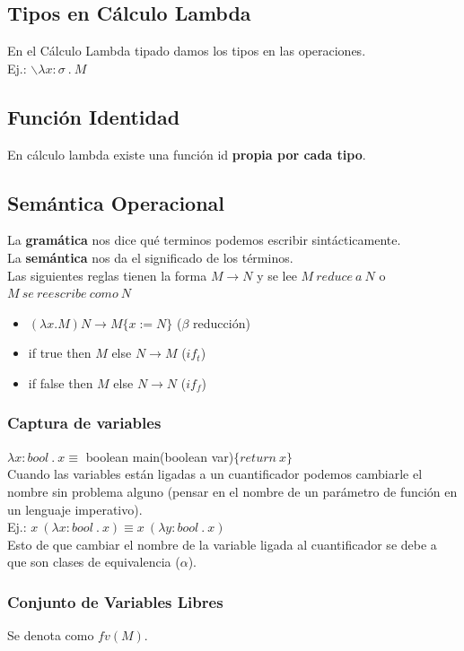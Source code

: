 \documentclass[10pt,a4paper]{article}
\begin{document}
\subsection{Tipos en Cálculo Lambda}
En el Cálculo Lambda tipado damos los tipos en las operaciones. \\
Ej.: $\backslash \lambda x:\sigma \ . \ M$
\subsection*{Función Identidad}
En cálculo lambda existe una función id \textbf{propia por cada tipo}.
\subsection{Semántica Operacional}
La \textbf{gramática} nos dice qué terminos podemos escribir sintácticamente. \\
La \textbf{semántica} nos da el significado de los términos. \\
Las siguientes reglas tienen la forma $M \rightarrow N$ y se lee $M \ reduce \ a \ N$ o $M \ se \ reescribe \ como \ N$ \\
\begin{itemize}
    \item $(\lambda x . M) N \rightarrow M \{x := N\}$ ($\beta$ reducción)
    \item if true then $M$ else $N \rightarrow M$ ($if_{t}$)
    \item if false then $M$ else $N \rightarrow N$ ($if_{f}$)
\end{itemize}
\subsubsection{Captura de variables}
$\lambda x:bool \ . \ x \equiv $ boolean main(boolean var)$\{return \ x\}$ \\
Cuando las variables están ligadas a un cuantificador podemos cambiarle el nombre sin problema alguno (pensar en el nombre de un parámetro de función en un lenguaje imperativo). \\
Ej.: $x \ (\lambda x:bool \ . \ x) \equiv x \ (\lambda y:bool \ . \ x)$ \\
Esto de que cambiar el nombre de la variable ligada al cuantificador se debe a que son clases de equivalencia ($\alpha$).

\subsubsection{Conjunto de Variables Libres}
Se denota como $fv(M)$.
\end{document}
